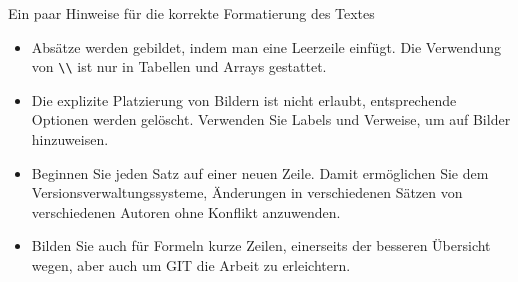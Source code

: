 \begin{refsection}
Ein paar Hinweise für die korrekte Formatierung des Textes
\begin{itemize}
\item
Absätze werden gebildet, indem man eine Leerzeile einfügt.
Die Verwendung von \verb+\\+ ist nur in Tabellen und Arrays gestattet.
\item
Die explizite Platzierung von Bildern ist nicht erlaubt, entsprechende
Optionen werden gelöscht. 
Verwenden Sie Labels und Verweise, um auf Bilder hinzuweisen.
\item
Beginnen Sie jeden Satz auf einer neuen Zeile. 
Damit ermöglichen Sie dem Versionsverwaltungssysteme, Änderungen
in verschiedenen Sätzen von verschiedenen Autoren ohne Konflikt 
anzuwenden.
\item 
Bilden Sie auch für Formeln kurze Zeilen, einerseits der besseren
Übersicht wegen, aber auch um GIT die Arbeit zu erleichtern.
\end{itemize}






\printbibliography[heading=subbibliography]
\end{refsection}
